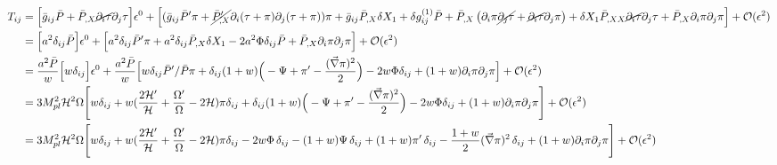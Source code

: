 \documentclass[a4paper,14pt]{article}
\begin{document}
\begin{align} \label{Tij}
T_{i j} &
= \Big[ \bar{g}_{i j} \bar{P} 
+
 \bar{P}_{,X} \cancel{ \partial_{i} \tau}\partial_{j} \tau \Big] \epsilon ^0 
+
\Big[ ({\bar{g}_{i j}} \bar{P}' \pi+\cancel{\bar{P}'_{,X}} \partial_{i} (\tau+\pi) \partial_{j}(\tau+\pi))\pi+ \bar{g}_{i j}  \bar{P}_{,X} \delta X_1 
+
 \delta g^{(1)}_{i j} \bar{P} 
 +
  \bar{P}_{,X}  \left ( \partial_{i} \pi \cancel{\partial_{j} \tau  }
  +
\cancel{  \partial_{i} \tau }\partial_{j} \pi  \right ) 
  +
   \delta X_1 \bar{P}_{,XX}   \cancel{ \partial_{i} \tau }\partial_{j} \tau  
   +
    \bar{P}_{,X}   \partial_{i} \pi \partial_{j} \pi \Big ]
+ \mathcal {O}(\epsilon^{2}) 
\nonumber \\ & 
= \Big[ a^2 \delta_{ij} \bar{P} 
 \Big] \epsilon ^0 
+
\Big[ a^2  \delta_{ij}  \bar{P}' \pi+ a^2  \delta_{ij}   \bar{P}_{,X} \delta X_1 
-
 2 a^2 \Phi \delta_{ij} \bar{P} 
     +
    \bar{P}_{,X}   \partial_{i} \pi \partial_{j} \pi \Big ] 
+ \mathcal {O}(\epsilon^{2}) 
\nonumber \\ & 
= \frac{ a^2 \bar{P}}{w}   \Big[ w \delta_{ij} 
\Big] \epsilon ^0 
+
\frac{ a^2  \bar{P}}{w} \Big[ w   \delta_{ij}  \bar{P}'  /\bar{P} \pi+  \delta_{ij}   (1+w)  \Big (-\Psi+{\pi'}- \frac{ (\vec{\nabla} \pi)^2 }{2 } \Big ) 
-
 2  w \Phi \delta_{ij} 
     +
   (1+w)  \partial_{i} \pi \partial_{j} \pi \Big ] 
+ \mathcal {O}(\epsilon^{2}) 
\nonumber \\ & 
=3 M_{pl}^2 \mathcal{H}^2 \Omega    \Bigg[w \delta_{ij} + w (\frac{2 \mathcal{H}' }{\mathcal{H}} + \frac{\Omega'}{\Omega} - 2\mathcal{H}) \pi \delta_{ij} 
+
 \delta_{ij}   (1+w)  \Big (-\Psi+{\pi'}- \frac{(\vec{\nabla} \pi)^2  }{2 }  \Big )
-
 2 w \Phi \delta_{ij} 
     +
   {(1+w)}  \partial_{i} \pi \partial_{j} \pi \Bigg ]
+ \mathcal {O}(\epsilon^{2}) 
\nonumber \\ & 
=3 M_{pl}^2 \mathcal{H}^2 \Omega    \Bigg[  w \delta_{ij} + w (\frac{2 \mathcal{H}' }{\mathcal{H}} + \frac{\Omega'}{\Omega} - 2\mathcal{H}) \pi \delta_{ij} 
-
 2 w \Phi \,  \delta_{ij} - (1+w) \Psi \, \delta_{ij}+  (1+w) {\pi'} \, \delta_{ij} - \frac{1+w}{2}   (\vec{\nabla} \pi)^2 \, \delta_{ij} +{(1+w)}  \partial_{i} \pi \partial_{j} \pi    \Bigg ] 
     + \mathcal {O}(\epsilon^{2}) 
\end{align}
\end{document}
